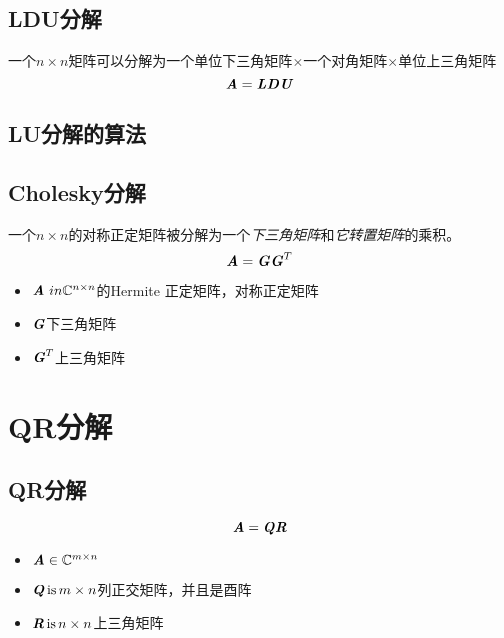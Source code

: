 \subsection{LDU分解}
\label{sub:LDU分解}

\begin{definition}[LDU分解]
    一个$n \times n$矩阵可以分解为一个单位下三角矩阵$\times$一个对角矩阵$\times$单位上三角矩阵
    $$
    \boldsymbol{\mathit{A}} = \boldsymbol{\mathit{L}} \boldsymbol{\mathit{D}} \boldsymbol{\mathit{U}}
    $$
\end{definition}

\subsection{LU分解的算法}
\label{sub:LU分解的算法}

\subsection{Cholesky分解}
\label{sub:Cholesky分解}

\begin{definition}
    一个$n \times n$的对称正定矩阵被分解为一个\emph{下三角矩阵}和\emph{它转置矩阵}的乘积。
    $$
    \boldsymbol{\mathit{A}} = \boldsymbol{\mathit{G}} \boldsymbol{\mathit{G}}^T
    $$
    \begin{itemize}
        \item $\boldsymbol{\mathit{A}} \ in \mathbb{C}^{n \times n}$的Hermite 正定矩阵，对称正定矩阵
        \item $\boldsymbol{\mathit{G}}$下三角矩阵
        \item $\boldsymbol{\mathit{G}}^T$上三角矩阵
    \end{itemize}
\end{definition}

\section{QR分解}
\label{sec:QR分解}

\subsection{QR分解}
\label{sub:QR分解}

\begin{definition}[QR分解]
    $$
    \boldsymbol{\mathit{A}} = \boldsymbol{\mathit{Q}} \boldsymbol{\mathit{R}}
    $$
    \begin{itemize}
        \item $\boldsymbol{\mathit{A}} \in \mathbb{C}^{m \times n}$
        \item $\boldsymbol{\mathit{Q}} \, \text{is} \, m \times n$列正交矩阵，并且是酉阵
        \item $\boldsymbol{\mathit{R}} \, \text{is} \, n \times n$上三角矩阵
    \end{itemize}
\end{definition}


